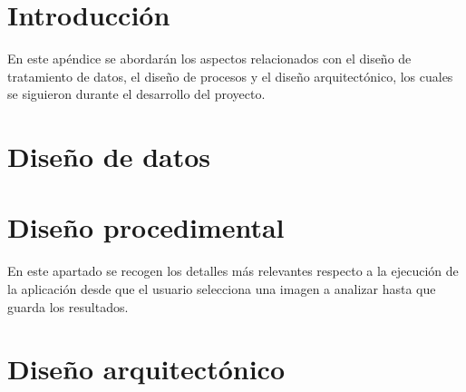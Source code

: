 
\section{Introducción}\label{introducción-diseño}

En este apéndice se abordarán los aspectos relacionados con el diseño de tratamiento de datos, el diseño de procesos y el diseño arquitectónico, los cuales se siguieron durante el desarrollo del proyecto.

\section{Diseño de datos}\label{diseño-de-datos}

\section{Diseño procedimental}\label{diseño-procedimental}

En este apartado se recogen los detalles más relevantes respecto a la ejecución de la aplicación desde que el usuario selecciona una imagen a analizar hasta que guarda los resultados.


\section{Diseño arquitectónico}\label{diseño-arquitectónico}



